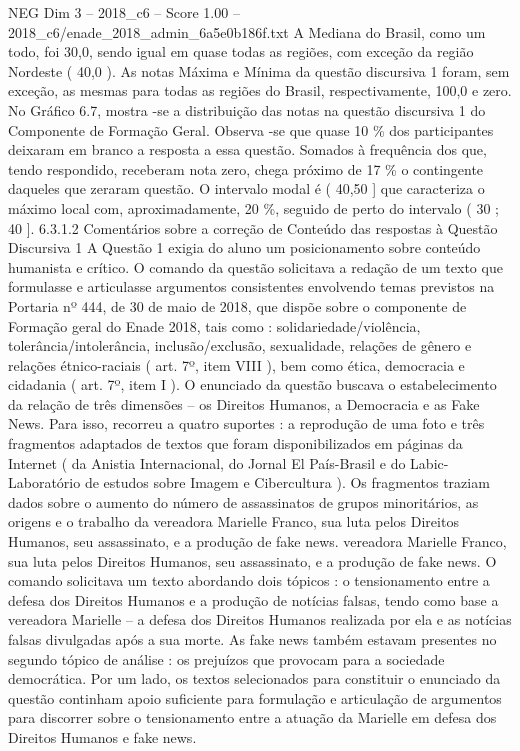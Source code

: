 \begin{textsample}{NEG Dim 3 – 2018\_c6 – Score 1.00 – 2018\_c6/enade\_2018\_admin\_6a5e0b186f.txt}
A Mediana do Brasil, como um todo, foi 30,0, sendo igual em quase todas as regiões, com exceção da região Nordeste ( 40,0 ).
As notas Máxima e Mínima da questão discursiva 1 foram, sem exceção, as mesmas para todas as regiões do Brasil, respectivamente, 100,0 e zero.
No Gráfico 6.7, mostra -se a distribuição das notas na questão discursiva 1 do Componente de Formação Geral.
Observa -se que quase 10 \% dos participantes deixaram em branco a resposta a essa questão.
Somados à frequência dos que, tendo respondido, receberam nota zero, chega próximo de 17 \% o contingente daqueles que zeraram questão.
O intervalo modal é ( 40,50 ] que caracteriza o máximo local com, aproximadamente, 20 \%, seguido de perto do intervalo ( 30 ; 40 ]. 6.3.1.2 Comentários sobre a correção de Conteúdo das respostas à Questão Discursiva 1 A Questão 1 exigia do aluno um posicionamento sobre conteúdo humanista e crítico.
O comando da questão solicitava a redação de um texto que formulasse e articulasse argumentos consistentes envolvendo temas previstos na Portaria nº 444, de 30 de maio de 2018, que dispõe sobre o componente de Formação geral do Enade 2018, tais como : solidariedade/violência, tolerância/intolerância, inclusão/exclusão, sexualidade, relações de gênero e relações étnico-raciais ( art. 7º, item VIII ), bem como ética, democracia e cidadania ( art. 7º, item I ).
O enunciado da questão buscava o estabelecimento da relação de três dimensões – os Direitos Humanos, a Democracia e as Fake News.
Para isso, recorreu a quatro suportes : a reprodução de uma foto e três fragmentos adaptados de textos que foram disponibilizados em páginas da Internet ( da Anistia Internacional, do Jornal El País-Brasil e do Labic-Laboratório de estudos sobre Imagem e Cibercultura ).
Os fragmentos traziam dados sobre o aumento do número de assassinatos de grupos minoritários, as origens e o trabalho da vereadora Marielle Franco, sua luta pelos Direitos Humanos, seu assassinato, e a produção de fake news. vereadora Marielle Franco, sua luta pelos Direitos Humanos, seu assassinato, e a produção de fake news.
O comando solicitava um texto abordando dois tópicos : o tensionamento entre a defesa dos Direitos Humanos e a produção de notícias falsas, tendo como base a vereadora Marielle – a defesa dos Direitos Humanos realizada por ela e as notícias falsas divulgadas após a sua morte.
As fake news também estavam presentes no segundo tópico de análise : os prejuízos que provocam para a sociedade democrática.
Por um lado, os textos selecionados para constituir o enunciado da questão continham apoio suficiente para formulação e articulação de argumentos para discorrer sobre o tensionamento entre a atuação da Marielle em defesa dos Direitos Humanos e fake news.

\end{textsample}
